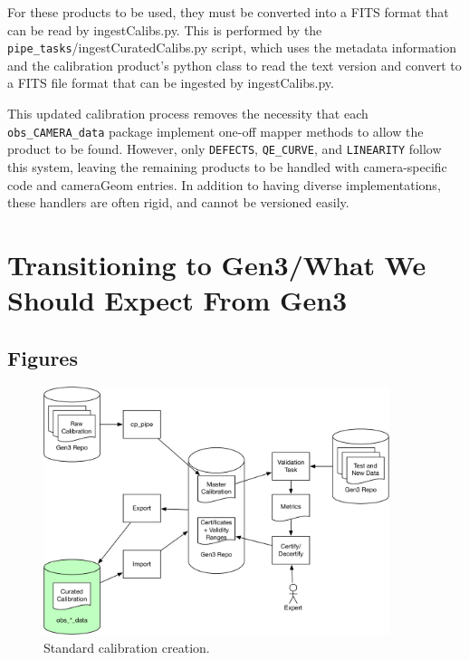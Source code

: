 \documentclass[DM,authoryear,toc]{lsstdoc}
\begin{document}
For these products to be used, they must be converted into a FITS
format that can be read by ingestCalibs.py.  This is performed by the
\verb|pipe_tasks|/ingestCuratedCalibs.py script, which uses the metadata
information and the calibration product's python class to read the
text version and convert to a FITS file format that can be ingested by
ingestCalibs.py.

This updated calibration process removes the necessity that each
\verb|obs_CAMERA_data| package implement one-off mapper methods to allow the
product to be found.  However, only \verb|DEFECTS|, \verb|QE_CURVE|, and \verb|LINEARITY|
follow this system, leaving the remaining products to be handled with
camera-specific code and cameraGeom entries.  In addition to having
diverse implementations, these handlers are often rigid, and cannot be
versioned easily.

\section{Transitioning to Gen3/What We Should Expect From Gen3}

\subsection{Figures}

\begin{figure}
  \caption{Standard calibration creation.}
  \centering
  \includegraphics[width=0.9\textwidth]{figures/Standard_Calibration.pdf}
\end{figure}
\end{document}

